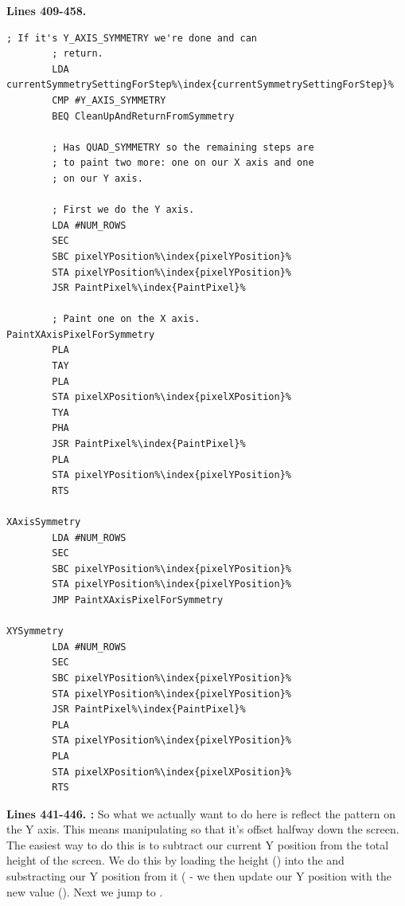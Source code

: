 \clearpage
\textbf{Lines 409-458. }
\begin{lstlisting}[escapechar=\%]
        ; If it's Y_AXIS_SYMMETRY we're done and can 
        ; return.
        LDA currentSymmetrySettingForStep%\index{currentSymmetrySettingForStep}%
        CMP #Y_AXIS_SYMMETRY
        BEQ CleanUpAndReturnFromSymmetry

        ; Has QUAD_SYMMETRY so the remaining steps are
        ; to paint two more: one on our X axis and one
        ; on our Y axis.

        ; First we do the Y axis.
        LDA #NUM_ROWS
        SEC 
        SBC pixelYPosition%\index{pixelYPosition}%
        STA pixelYPosition%\index{pixelYPosition}%
        JSR PaintPixel%\index{PaintPixel}%

        ; Paint one on the X axis.
PaintXAxisPixelForSymmetry    
        PLA 
        TAY 
        PLA 
        STA pixelXPosition%\index{pixelXPosition}%
        TYA 
        PHA 
        JSR PaintPixel%\index{PaintPixel}%
        PLA 
        STA pixelYPosition%\index{pixelYPosition}%
        RTS 

XAxisSymmetry   
        LDA #NUM_ROWS
        SEC 
        SBC pixelYPosition%\index{pixelYPosition}%
        STA pixelYPosition%\index{pixelYPosition}%
        JMP PaintXAxisPixelForSymmetry

XYSymmetry   
        LDA #NUM_ROWS
        SEC 
        SBC pixelYPosition%\index{pixelYPosition}%
        STA pixelYPosition%\index{pixelYPosition}%
        JSR PaintPixel%\index{PaintPixel}%
        PLA 
        STA pixelYPosition%\index{pixelYPosition}%
        PLA 
        STA pixelXPosition%\index{pixelXPosition}%
        RTS 
\end{lstlisting}
\clearpage

\textbf{Lines 441-446. :} So what we actually want to do here is reflect the pattern on the Y axis. This means manipulating  so that it's
offset halfway down the screen.  The easiest way to do this is to subtract our current Y position from the total height of the screen.
We do this by loading the height () into the  and substracting our Y position from it 
( - we then update our Y position with the new value (). Next we jump to
.

